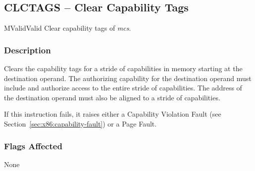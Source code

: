 \clearpage
{}
{}
\subsection*{CLCTAGS -- Clear Capability Tags}

\begin{x86opcodetable}
  {M}{Valid}{Valid}
  {Clear capability tags of \emph{mcs}.}
\end{x86opcodetable}

\begin{x86opentable}
\end{x86opentable}

\subsubsection*{Description}

Clears the capability tags for a stride of capabilities in memory
starting at the destination operand.  The authorizing capability for
the destination operand must include \cappermS{} and authorize access
to the entire stride of capabilities.  The address of the destination
operand must also be aligned to a stride of capabilities.

If this instruction fails, it raises either a Capability Violation
Fault (see Section~\ref{sec:x86:capability-fault}) or a Page Fault.

\subsubsection*{Flags Affected}

None
